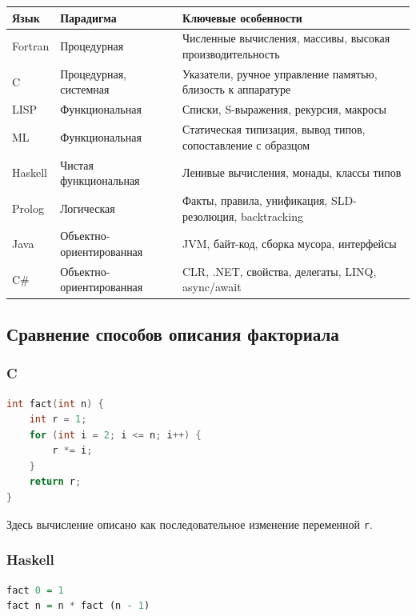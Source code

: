 \documentclass[12pt,a4paper]{article}
\begin{document}
\begin{center}
\begin{tabular}{|m{2.5cm}|m{3cm}|m{6cm}|}
\hline
\textbf{Язык} & \textbf{Парадигма} & \textbf{Ключевые особенности} \\
\hline
Fortran & Процедурная & Численные вычисления, массивы, высокая производительность \\
\hline
C & Процедурная, системная & Указатели, ручное управление памятью, близость к аппаратуре \\
\hline
LISP & Функциональная & Списки, S-выражения, рекурсия, макросы \\
\hline
ML & Функциональная & Статическая типизация, вывод типов, сопоставление с образцом \\
\hline
Haskell & Чистая функциональная & Ленивые вычисления, монады, классы типов \\
\hline
Prolog & Логическая & Факты, правила, унификация, SLD-резолюция, backtracking \\
\hline
Java & Объектно-ориентированная & JVM, байт-код, сборка мусора, интерфейсы \\
\hline
C\# & Объектно-ориентированная & CLR, .NET, свойства, делегаты, LINQ, async/await \\
\hline
\end{tabular}
\end{center}

\subsection{Сравнение способов описания факториала}

\subsubsection{C}

\begin{lstlisting}[language=C]
int fact(int n) {
    int r = 1;
    for (int i = 2; i <= n; i++) {
        r *= i;
    }
    return r;
}
\end{lstlisting}

Здесь вычисление описано как последовательное изменение переменной \texttt{r}.

\subsubsection{Haskell}

\begin{lstlisting}[language=Haskell]
fact 0 = 1
fact n = n * fact (n - 1)
\end{lstlisting}
\end{document}
